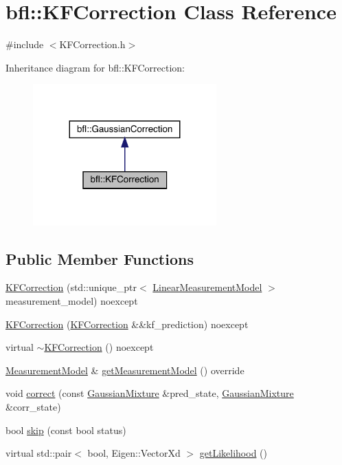 \hypertarget{classbfl_1_1KFCorrection}{}\section{bfl\+:\+:K\+F\+Correction Class Reference}
\label{classbfl_1_1KFCorrection}


{\ttfamily \#include $<$K\+F\+Correction.\+h$>$}



Inheritance diagram for bfl\+:\+:K\+F\+Correction\+:
\nopagebreak
\begin{figure}[H]
\begin{center}
\leavevmode
\includegraphics[width=200pt]{classbfl_1_1KFCorrection__inherit__graph}
\end{center}
\end{figure}
\subsection*{Public Member Functions}
\begin{DoxyCompactItemize}
\item 
\mbox{\hyperlink{classbfl_1_1KFCorrection_a4d676d6417b521731f2e88d3507168b7}{K\+F\+Correction}} (std\+::unique\+\_\+ptr$<$ \mbox{\hyperlink{classbfl_1_1LinearMeasurementModel}{Linear\+Measurement\+Model}} $>$ measurement\+\_\+model) noexcept
\item 
\mbox{\hyperlink{classbfl_1_1KFCorrection_a5c3aced3721909b74dcc26b431411196}{K\+F\+Correction}} (\mbox{\hyperlink{classbfl_1_1KFCorrection}{K\+F\+Correction}} \&\&kf\+\_\+prediction) noexcept
\item 
virtual \mbox{\hyperlink{classbfl_1_1KFCorrection_a554b12516652b8018a714194479182f5}{$\sim$\+K\+F\+Correction}} () noexcept
\item 
\mbox{\hyperlink{classbfl_1_1MeasurementModel}{Measurement\+Model}} \& \mbox{\hyperlink{classbfl_1_1KFCorrection_a71faf84180752e4e31b4eaa5db1c18d1}{get\+Measurement\+Model}} () override
\item 
void \mbox{\hyperlink{classbfl_1_1GaussianCorrection_a6308c8af37a1a451eba8e87e73952c84}{correct}} (const \mbox{\hyperlink{classbfl_1_1GaussianMixture}{Gaussian\+Mixture}} \&pred\+\_\+state, \mbox{\hyperlink{classbfl_1_1GaussianMixture}{Gaussian\+Mixture}} \&corr\+\_\+state)
\item 
bool \mbox{\hyperlink{classbfl_1_1GaussianCorrection_a986b05b149650ea4dd725b10700db57f}{skip}} (const bool status)
\item 
virtual std\+::pair$<$ bool, Eigen\+::\+Vector\+Xd $>$ \mbox{\hyperlink{classbfl_1_1GaussianCorrection_a955702adbdad6448d8f306752d3d0868}{get\+Likelihood}} ()
\end{DoxyCompactItemize}
